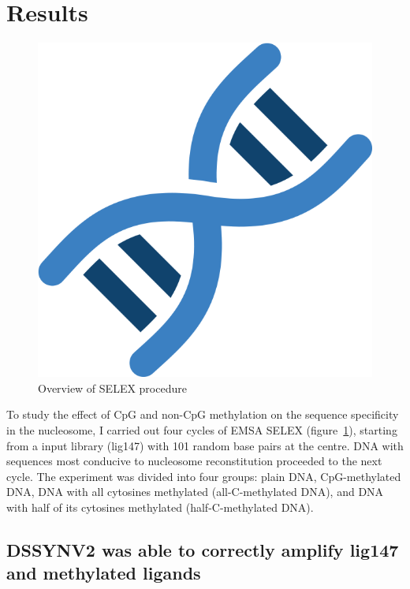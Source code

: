 \documentclass[parskip=full, numbers=noenddot]{scrreprt}
\begin{document}

\section{Results}
\label{sec:emsaselex_results}

\begin{figure}[htpb]
  \centering
  \includegraphics[width=\textwidth]{test}
  \caption{Overview of SELEX procedure}
  \label{fig:selex}
\end{figure}

To study the effect of CpG and non-CpG methylation on the sequence specificity in the nucleosome, I carried out four cycles of EMSA SELEX (figure~\ref{fig:selex}), starting from a input library (lig147) with 101 random base pairs at the centre. DNA with sequences most conducive to nucleosome reconstitution proceeded to the next cycle. The experiment was divided into four groups: plain DNA, CpG-methylated DNA, DNA with all cytosines methylated (all-C-methylated DNA), and DNA with half of its cytosines methylated (half-C-methylated DNA).

\subsection{DSSYNV2 was able to correctly amplify lig147 and methylated ligands}
\label{ssec:amplig}
\end{document}
